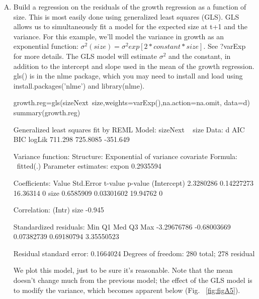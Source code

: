 \documentclass[11pt]{article}
\begin{document}
\begin{enumerate}[(A)]

\item Build a regression on the residuals of the growth regression as a function of size. This is most easily done using generalized least squares (GLS). GLS allows us to simultaneously fit a model for the expected size at t+1 and the variance. For this example, we'll model the variance in growth as an exponential function: $\sigma^2(size)=\sigma^2 exp[2*constant*size]$. See ?varExp for more details. The GLS model will estimate $\sigma^2$ and the constant, in addition to the intercept and slope used in the mean of the growth regression. gls() is in the nlme package, which you may need to install and load using install.packages('nlme') and library(nlme).

\begin{Schunk}
\begin{Sinput}
 growth.reg=gls(sizeNext~size,weights=varExp(),na.action=na.omit, data=d)
 summary(growth.reg)
\end{Sinput}
\begin{Soutput}
Generalized least squares fit by REML
  Model: sizeNext ~ size 
  Data: d 
      AIC      BIC   logLik
  711.298 725.8085 -351.649

Variance function:
 Structure: Exponential of variance covariate
 Formula: ~fitted(.) 
 Parameter estimates:
    expon 
0.2935594 

Coefficients:
                Value  Std.Error  t-value p-value
(Intercept) 2.3280286 0.14227273 16.36314       0
size        0.6585909 0.03301602 19.94762       0

 Correlation: 
     (Intr)
size -0.945

Standardized residuals:
        Min          Q1         Med          Q3         Max 
-3.29676786 -0.68003669  0.07382739  0.69180794  3.35550523 

Residual standard error: 0.1664024 
Degrees of freedom: 280 total; 278 residual
\end{Soutput}
\end{Schunk}

We plot this model, just to be sure it's reasonable. Note that the mean doesn't change much from the previous model; the effect of the GLS model is to modify the variance, which becomes apparent below (Fig. ~\ref{fig:figA5}).


\end{enumerate}
\end{document}
